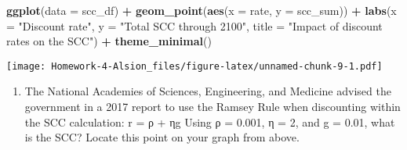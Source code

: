 \documentclass[
]{article}
\newenvironment{Shaded}{\begin{snugshade}}{\end{snugshade}}
\newcommand{\CommentTok}[1]{\textcolor[rgb]{0.56,0.35,0.01}{\textit{#1}}}
\newcommand{\DataTypeTok}[1]{\textcolor[rgb]{0.13,0.29,0.53}{#1}}
\newcommand{\DecValTok}[1]{\textcolor[rgb]{0.00,0.00,0.81}{#1}}
\newcommand{\FloatTok}[1]{\textcolor[rgb]{0.00,0.00,0.81}{#1}}
\newcommand{\KeywordTok}[1]{\textcolor[rgb]{0.13,0.29,0.53}{\textbf{#1}}}
\newcommand{\NormalTok}[1]{#1}
\newcommand{\OperatorTok}[1]{\textcolor[rgb]{0.81,0.36,0.00}{\textbf{#1}}}
\newcommand{\StringTok}[1]{\textcolor[rgb]{0.31,0.60,0.02}{#1}}
\providecommand{\tightlist}{%
  \setlength{\itemsep}{0pt}\setlength{\parskip}{0pt}}
\begin{document}
\begin{Shaded}
\begin{Highlighting}[]
\KeywordTok{ggplot}\NormalTok{(}\DataTypeTok{data =}\NormalTok{ scc_df) }\OperatorTok{+}
\StringTok{  }\KeywordTok{geom_point}\NormalTok{(}\KeywordTok{aes}\NormalTok{(}\DataTypeTok{x =}\NormalTok{ rate, }\DataTypeTok{y =}\NormalTok{ scc_sum)) }\OperatorTok{+}
\StringTok{  }\KeywordTok{labs}\NormalTok{(}\DataTypeTok{x =} \StringTok{"Discount rate"}\NormalTok{, }\DataTypeTok{y =} \StringTok{"Total SCC through 2100"}\NormalTok{, }\DataTypeTok{title =} \StringTok{"Impact of discount rates on the SCC"}\NormalTok{) }\OperatorTok{+}
\StringTok{  }\KeywordTok{theme_minimal}\NormalTok{()}
\end{Highlighting}
\end{Shaded}

\texttt{[image: Homework-4-Alsion\_files/figure-latex/unnamed-chunk-9-1.pdf]}

\begin{enumerate}
\def\labelenumi{\arabic{enumi}.}
\setcounter{enumi}{3}
\tightlist
\item
  The National Academies of Sciences, Engineering, and Medicine advised
  the government in a 2017 report to use the Ramsey Rule when
  discounting within the SCC calculation: r = ρ + ηg Using ρ = 0.001, η
  = 2, and g = 0.01, what is the SCC? Locate this point on your graph
  from above.
\end{enumerate}

\begin{Shaded}
\end{Shaded}
\end{document}
